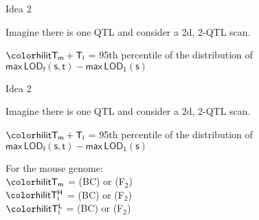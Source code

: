 \documentclass[aspectratio=169,12pt,t]{beamer}
\newcommand{\lod}{\text{LOD}}
\begin{document}
\begin{frame}{Idea 2}


\hfill \begin{minipage}{10in}

Imagine there is one QTL and consider a 2d, 2-QTL scan.

\vspace{1cm}

\hspace*{0.5in} $\mathsf{\hilit T_m + T_i}$ = 95th percentile of the
  distribution of \\[6pt]
\hspace*{2.0in} {\lolit $\mathsf{ \text{max} \, \lod_f(s,t) -
    \text{max} \, \lod_1(s)}$}


\end{minipage}



\end{frame}







\addtocounter{page}{-1}

\begin{frame}{Idea 2}


\hfill \begin{minipage}{10in}

Imagine there is one QTL and consider a 2d, 2-QTL scan.

\vspace{1cm}

\hspace*{0.5in} $\mathsf{\hilit T_m + T_i}$ = 95th percentile of the
  distribution of \\[6pt]
\hspace*{2.0in} {\lolit $\mathsf{ \text{max} \, \lod_f(s,t) -
    \text{max} \, \lod_1(s)}$}


\vspace{2cm}

For the mouse genome: \\[12pt]
\hspace*{0.5in} $\mathsf{\hilit T_m}$ = {} (BC) or {} (F$_{\mathsf{2}}$) \\[12pt]
\hspace*{0.5in} $\mathsf{\hilit T^H_i}$ = {} (BC) or {} (F$_{\mathsf{2}}$) \\[12pt]
\hspace*{0.5in} $\mathsf{\hilit T^L_i}$ = {} (BC) or {} (F$_{\mathsf{2}}$)


\end{minipage}

\end{frame}
\end{document}
